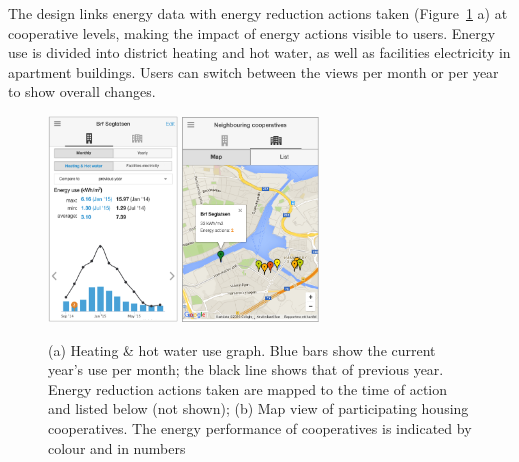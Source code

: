 
The design links energy data with energy reduction actions taken (Figure~\ref{fig:Figure201_Actions} a) at cooperative levels, making the impact of energy actions visible to users. Energy use is divided into district heating and hot water, as well as facilities electricity in apartment buildings. Users can switch between the views per month or per year to show overall changes. %
%
\begin{figure}[t!]
	\sidecaption[t]
	\includegraphics[height=5.45cm]{img/Figure201_Actions.png}
		\includegraphics[height=5.42cm]{img/Figure202_Housing_cooperatives_comparison.png}
	\caption{ (a) Heating \& hot water use graph. Blue bars show the current year's use per month; the black line shows that of previous year. Energy reduction actions taken are mapped to the time of action and listed below (not shown); (b) Map view of participating housing cooperatives. The energy performance of cooperatives is indicated by colour and in numbers}
	\label{fig:Figure201_Actions}
\end{figure}
